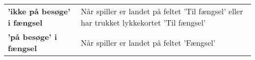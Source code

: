 \documentclass[class=article, crop=false]{standalone}
\begin{document}
    \begin{table}[H]
        \begin{tabularx}{\textwidth}{lX}

            \textbf{'ikke på besøge' i fængsel}& Når spiller er landet på feltet
                                            'Til fængsel' eller har trukket
                                             lykkekortet 'Til fængsel' \\
            \textbf{'på besøge' i fængsel}   & Når spiller er landet på feltet 'Fængsel'\\

        \end{tabularx}


    \end{table}
\end{document}
